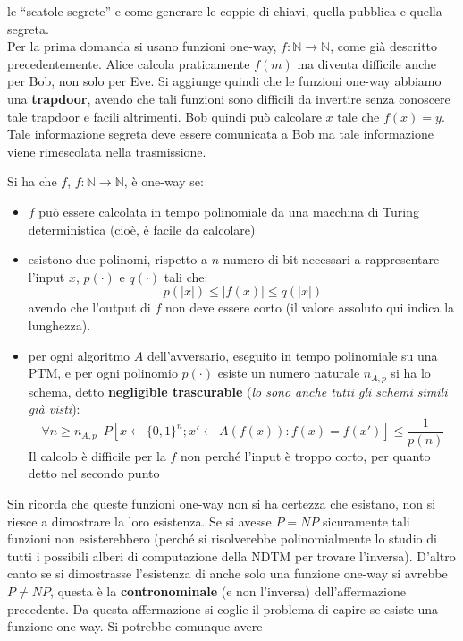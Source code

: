 \documentclass[a4paper,12pt, oneside]{book}
\begin{document}
le ``scatole segrete'' e
come generare le coppie di chiavi, quella pubblica e quella segreta.\\
Per la prima domanda si usano funzioni one-way, $f:\mathbb{N}\to\mathbb{N}$,
come già descritto precedentemente. Alice calcola praticamente $f(m)$ ma diventa
difficile anche per Bob, non solo per Eve. Si aggiunge quindi che le funzioni
one-way abbiamo una \textbf{trapdoor}, avendo che tali funzioni sono difficili
da invertire senza conoscere tale trapdoor e facili altrimenti. Bob quindi può
calcolare $x$ tale che $f(x)=y$. Tale informazione segreta deve essere
comunicata a Bob ma tale informazione viene rimescolata nella trasmissione.
\begin{definizione}
  Si ha che $f$, $f:\mathbb{N}\to\mathbb{N}$, è one-way se:
  \begin{itemize}
    \item $f$ può essere calcolata in tempo polinomiale da una macchina di
    Turing deterministica (cioè, è facile da calcolare)  
    \item esistono due polinomi, rispetto a $n$ numero di bit necessari a
    rappresentare l'input $x$, $p(\cdot)$ e $q(\cdot)$ tali che:
    \[p(|x|)\leq |f(x)|\leq q(|x|)\]
    avendo che l'output di $f$ non deve essere corto (il valore assoluto qui
    indica la lunghezza). 
    \item per ogni algoritmo $A$ dell'avversario, eseguito in tempo polinomiale
    su una PTM, e per ogni polinomio $p(\cdot)$ esiste un numero naturale
    $n_{A,p}$ si ha lo schema, detto \textbf{negligible trascurable} (\textit{lo
      sono anche tutti gli schemi simili già visti}):
    \[\forall n\geq n_{A,p}\,\,\,P[x\gets\{0,1\}^n; x'\gets A(f(x)):
      f(x)=f(x')]\leq \frac{1}{p(n)}\]
    Il calcolo è difficile per la $f$ non perché l'input è troppo corto, per
    quanto detto nel secondo punto
  \end{itemize}
\end{definizione}
Sin ricorda che queste funzioni one-way non si ha certezza che esistano, non si
riesce a dimostrare la loro esistenza. Se si avesse $P=NP$ sicuramente tali
funzioni non esisterebbero (perché si risolverebbe polinomialmente lo studio di
tutti i possibili alberi di computazione della NDTM per trovare
l'inversa). D'altro canto se si dimostrasse l'esistenza di anche 
solo una funzione one-way si avrebbe $P\neq NP$, questa è la
\textbf{contronominale} (e non l'inversa) dell'affermazione precedente. Da
questa affermazione si coglie il problema di capire se esiste una funzione
one-way. Si potrebbe comunque avere 
\end{document}
